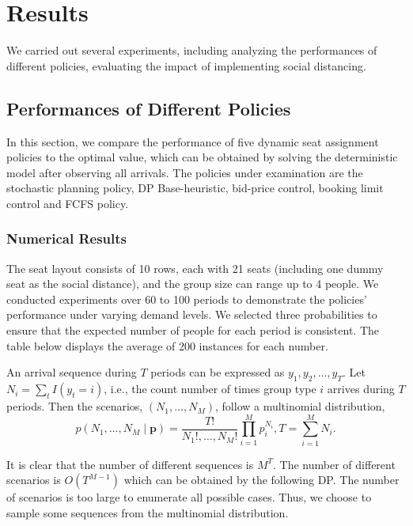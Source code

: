 \section{Results}
We carried out several experiments, including analyzing the performances of different policies, evaluating the impact of implementing social distancing.


\subsection{Performances of Different Policies}
In this section, we compare the performance of five dynamic seat assignment policies to the optimal value, which can be obtained by solving the deterministic model after observing all arrivals. The policies under examination are the stochastic planning policy, DP Base-heuristic, bid-price control, booking limit control and FCFS policy. 



\subsubsection*{Numerical Results}
The seat layout consists of 10 rows, each with 21 seats (including one dummy seat as the social distance), and the group size can range up to 4 people. We conducted experiments over 60 to 100 periods to demonstrate the policies' performance under varying demand levels. We selected three probabilities to ensure that the expected number of people for each period is consistent. The table below displays the average of 200 instances for each number.

An arrival sequence during $T$ periods can be expressed as ${y_1, y_2, \ldots, y_T}$. Let $N_i = \sum_{t} I(y_t = i)$, i.e., the count number of times group type $i$ arrives during $T$ periods. Then the scenarios, $(N_1, \ldots, N_M)$, follow a multinomial distribution, 
$$
p\left(N_1, \ldots, N_M \mid \mathbf{p}\right)=\frac{T !}{N_{1} !, \ldots, N_{M} !} \prod_{i=1}^M p_i^{N_i}, T=\sum_{i=1}^M N_i.
$$

It is clear that the number of different sequences is $M^T$. The number of different scenarios is
$O(T^{M-1})$ which can be obtained by the following DP. The number of scenarios is too large to enumerate all possible cases. Thus, we choose to sample some sequences from the multinomial distribution.


